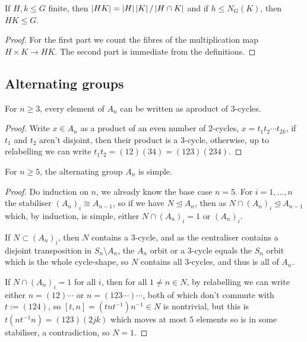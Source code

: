 \documentclass{article}
\begin{document}
\begin{proposition}
    If $H,k\leq G$ finite, then $\left| HK \right| = \left| H \right|\left| K \right|/\left| H\cap K \right|$ and if $h\leq N_G(K)$, then $HK\leq G$.
    \begin{proof}
        For the first part we count the fibres of the multiplication map $H\times K\rightarrow HK$. The second part is immediate from the definitions.
    \end{proof}
\end{proposition}

\subsection{Alternating groups}

\begin{proposition}
    For $n\geq 3$, every element of $A_n$ can be written as aproduct of $3$-cycles.\begin{proof}
        Write $x\in A_n$ as a product of an even number of $2$-cycles, $x=t_1t_2\cdots t_{2k}$, if $t_1$ and $t_2$ aren't disjoint, then their product is a $3$-cycle, otherwise, up to relabelling we can write $t_1t_2=(12)(34) = (123)(234)$.
    \end{proof}
\end{proposition}

\begin{theorem}
    For $n\geq 5$, the alternating group $A_n$ is simple.\begin{proof}
        Do induction on $n$, we already know the base case $n=5$. For $i=1,\ldots,n$ the stabiliser $(A_n)_i\cong A_{n-1}$, so if we have $N\unlhd A_n$, then as $N\cap (A_n)_i\unlhd A_{n-1}$ which, by induction, is simple, either $N\cap (A_n)_i=1$ or $(A_n)_i$.

        If $N\subset (A_n)_i$, then $N$ contains a $3$-cycle, and as the centraliser contains a disjoint transposition in $S_n\setminus A_n$, the $A_n$ orbit or a $3$-cycle equals the $S_n$ orbit which is the whole cycle-shape, so $N$ contains all $3$-cycles, and thus is all of $A_n$.

        If $N\cap (A_n)_i=1$ for all $i$, then for all $1\neq n \in N$, by relabelling we can write either $n=(12)\cdots$ or $n=(123\cdots)\cdots$, both of which don't commute with $t:=(124)$, so $[t,n]=(tnt^{-1})n^{-1}\in N$ is nontrivial, but this is $t(nt^{-1}n)=(123)(2jk)$ which moves at most $5$ elements so is in some stabiliser, a contradiction, so $N=1$.
    \end{proof}
\end{theorem}
\end{document}
